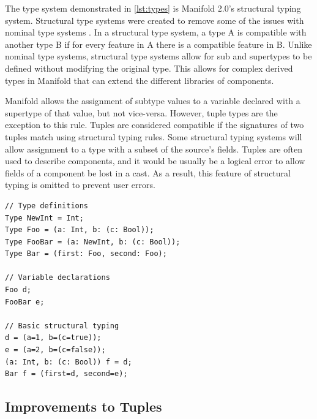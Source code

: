 The type system demonstrated in \autoref{lst:types} is Manifold 2.0's structural typing system.
Structural type systems were
created to remove some of the issues with nominal type systems
\cite{Gil:2008:WIS:1449764.1449771}. In a structural
type system, a type A is compatible with another type B if for every feature in
A there is a compatible feature in B. Unlike nominal type systems, structural
type systems allow for sub and supertypes to be defined without
modifying the original type. This allows for complex derived types in Manifold that
can extend the different libraries of components.

Manifold allows the assignment of subtype values to a variable declared with a supertype of that value,
but not vice-versa.
However, tuple types are the exception to this rule. Tuples are
considered compatible if the signatures of two tuples
match using structural typing rules.
Some structural typing systems will allow assignment to a type with a subset of the source's fields.
Tuples are often used to describe components, and it would be usually be a logical error to allow
fields of a component be lost in a cast. As a result, this feature of structural typing is omitted to
prevent user errors.

\begin{lstlisting}[label=lst:types,caption=Example of types in a Manifold file]
// Type definitions
Type NewInt = Int;
Type Foo = (a: Int, b: (c: Bool));
Type FooBar = (a: NewInt, b: (c: Bool));
Type Bar = (first: Foo, second: Foo);

// Variable declarations
Foo d;
FooBar e;

// Basic structural typing
d = (a=1, b=(c=true));
e = (a=2, b=(c=false));
(a: Int, b: (c: Bool)) f = d;
Bar f = (first=d, second=e);
\end{lstlisting}


\subsection{Improvements to Tuples}

